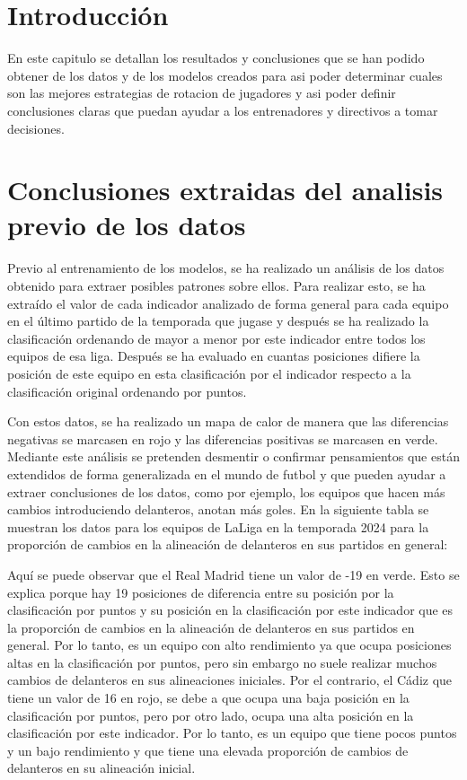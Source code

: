 
\section{Introducción}
En este capitulo se detallan los resultados y conclusiones que se han podido obtener de los datos y de los modelos creados para asi poder determinar cuales son las mejores estrategias de rotacion de jugadores y asi poder definir conclusiones claras que puedan ayudar a los entrenadores y directivos a tomar decisiones. 

\section{Conclusiones extraidas del analisis previo de los datos}

Previo al entrenamiento de los modelos, se ha realizado un análisis de los datos obtenido para 
extraer posibles patrones sobre ellos. Para realizar esto, se ha extraído el valor de cada indicador 
analizado de forma general para cada equipo en el último partido de la temporada que jugase y 
después se ha realizado la clasificación ordenando de mayor a menor por este indicador entre 
todos los equipos de esa liga. Después se ha evaluado en cuantas posiciones difiere la posición de 
este equipo en esta clasificación por el indicador respecto a la clasificación original ordenando 
por puntos. 

Con estos datos, se ha realizado un mapa de calor de manera que las diferencias negativas se 
marcasen en rojo y las diferencias positivas se marcasen en verde. Mediante este análisis se 
pretenden desmentir o confirmar pensamientos que están extendidos de forma generalizada en el 
mundo de futbol y que pueden ayudar a extraer conclusiones de los datos, como por ejemplo, los 
equipos que hacen más cambios introduciendo delanteros, anotan más goles.
En la siguiente tabla se muestran los datos para los equipos de LaLiga en la temporada 2024 para 
la proporción de cambios en la alineación de delanteros en sus partidos en general:



Aquí se puede observar que el Real Madrid tiene un valor de -19 en verde. Esto se explica porque 
hay 19 posiciones de diferencia entre su posición por la clasificación por puntos y su posición en 
la clasificación por este indicador que es la proporción de cambios en la alineación de delanteros 
en sus partidos en general. Por lo tanto, es un equipo con alto rendimiento ya que ocupa posiciones 
altas en la clasificación por puntos, pero sin embargo no suele realizar muchos cambios de 
delanteros en sus alineaciones iniciales. Por el contrario, el Cádiz que tiene un valor de 16 en rojo, 
se debe a que ocupa una baja posición en la clasificación por puntos, pero por otro lado, ocupa 
una alta posición en la clasificación por este indicador. Por lo tanto, es un equipo que tiene pocos 
puntos y un bajo rendimiento y que tiene una elevada proporción de cambios de delanteros en su 
alineación inicial.

